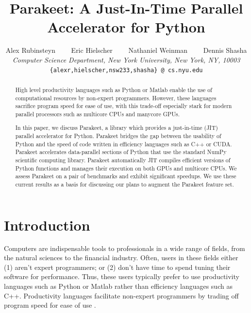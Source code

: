 \documentclass[10pt,twocolumn]{article}
\begin{document}
\title{Parakeet: A Just-In-Time Parallel Accelerator for Python}
\author{
Alex Rubinsteyn \ \ \ \ Eric Hielscher \ \ \ \ Nathaniel Weinman \ \ \ \
Dennis Shasha \\
{\it Computer Science Department, New York University, New York, NY, 10003} \\
\small{\tt \{alexr,hielscher,nsw233,shasha\} @ cs.nyu.edu}
}
\date{}

\newcommand{\MAP}{\impfnt{map}}
\newcommand{\REDUCE}{\impfnt{reduce}}
\newcommand{\SCAN}{\impfnt{scan}}
\newcommand{\ALLPAIRS}{\impfnt{allpairs}}
\newcommand{\concat}{\ensuremath{+\!\!\!\!+\,}}

\setlength\fboxsep{8pt}
\setlength\fboxrule{0.5pt}

\maketitle

\begin{abstract}
High level productivity languages such as Python or Matlab enable the use of computational resources by non-expert programmers.  However, these languages sacrifice program speed for ease of use, with this trade-off especially stark for modern parallel processors such as multicore CPUs and manycore GPUs.

In this paper, we discuss Parakeet, a library which provides a just-in-time (JIT) parallel accelerator for Python.  Parakeet bridges the gap between the usability of Python and the speed of code written in efficiency languages such as C++ or CUDA.  Parakeet accelerates data-parallel sections of Python that use the standard NumPy scientific computing library.  Parakeet automatically JIT compiles efficient versions of Python functions and manages their execution on both GPUs and multicore CPUs.  We assess Parakeet on a pair of benchmarks and exhibit significant speedups.  We use these current results as a basis for discussing our plans to augment the Parakeet feature set.
\end{abstract}

\section{Introduction}
\label{Intro}
Computers are indispensable tools to professionals in a wide range of fields, from the natural sciences to the financial industry.  Often, users in these fields either (1) aren't expert programmers; or (2) don't have time to spend tuning their software for performance.  Thus, these users typically prefer to use productivity languages such as Python or Matlab rather than efficiency languages such as C++.  Productivity languages facilitate non-expert programmers by trading off program speed for ease of use \cite{Pre03}.
\end{document}

